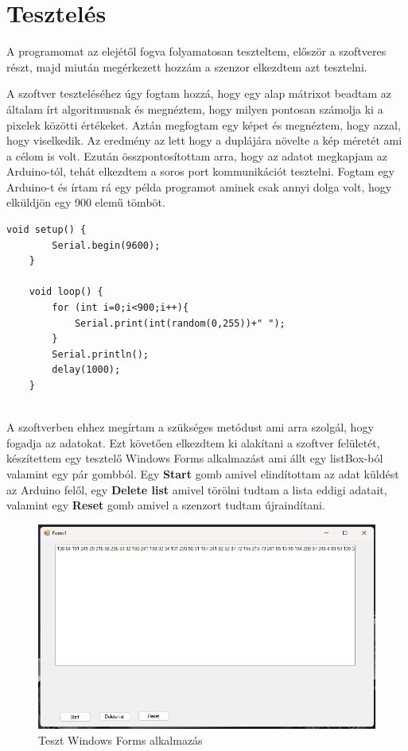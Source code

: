 \documentclass[]{thesis-ekf}
\theoremstyle{definition}
\theoremstyle{remark}
\begin{document}
\chapter{Tesztelés}
A programomat az elejétől fogva folyamatosan teszteltem, először a szoftveres részt, majd miután megérkezett hozzám a szenzor elkezdtem azt tesztelni. 

A szoftver teszteléséhez úgy fogtam hozzá, hogy egy alap mátrixot beadtam az általam írt algoritmusnak és megnéztem, hogy milyen pontosan számolja ki a pixelek közötti értékeket. Aztán megfogtam egy képet és megnéztem, hogy azzal, hogy viselkedik. Az eredmény az lett hogy a duplájára növelte a kép méretét ami a célom is volt. Ezután összpontosítottam arra, hogy az adatot megkapjam az Arduino-tól, tehát elkezdtem a soros port kommunikációt tesztelni. Fogtam egy Arduino-t és írtam rá egy példa programot aminek csak annyi dolga volt, hogy elküldjön egy 900 elemű tömböt.

\begin{lstlisting}[language=Arduino]
	void setup() {
		Serial.begin(9600);
	}
	
	void loop() {
		for (int i=0;i<900;i++){
			Serial.print(int(random(0,255))+" ");
		} 
		Serial.println();
		delay(1000);
	}
	
\end{lstlisting}

A szoftverben ehhez megírtam a szükséges metódust ami arra szolgál, hogy fogadja az adatokat. Ezt követően elkezdtem ki alakítani a szoftver felületét, készítettem egy tesztelő Windows Forms alkalmazást ami állt egy listBox-ból valamint egy pár gombból. Egy \textbf{Start} gomb amivel elindítottam az adat küldést az Arduino felől, egy \textbf{Delete list} amivel törölni tudtam a lista eddigi adatait, valamint egy \textbf{Reset} gomb amivel a szenzort tudtam újraindítani. 
\pagebreak
\begin{figure}[th!]
	\centering
	\includegraphics[width=0.7\linewidth]{tesztalkalmazas}
	\caption[Teszt alkalmazás]{Teszt Windows Forms alkalmazás}
	\label{fig:tesztalkalmazas}
\end{figure}
\end{document}
